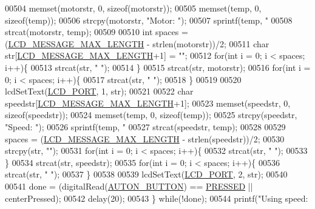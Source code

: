 \begin{DoxyCode}
{{{{{00504         memset(motorstr, 0, \textcolor{keyword}{sizeof}(motorstr));
00505         memset(temp, 0, \textcolor{keyword}{sizeof}(temp));
00506         strcpy(motorstr, \textcolor{stringliteral}{"Motor: "});
00507         sprintf(temp, \textcolor{stringliteral}{"%
00508         strcat(motorstr, temp);
00509 
00510         \textcolor{keywordtype}{int} spaces = (\hyperlink{lcdmsg_8h_abe4c4b70fc6f44ae3680e5b2c68cdd00}{LCD\_MESSAGE\_MAX\_LENGTH} - strlen(motorstr))/2;
00511         \textcolor{keywordtype}{char} str[\hyperlink{lcdmsg_8h_abe4c4b70fc6f44ae3680e5b2c68cdd00}{LCD\_MESSAGE\_MAX\_LENGTH}+1] = \textcolor{stringliteral}{""};
00512         \textcolor{keywordflow}{for}(\textcolor{keywordtype}{int} i = 0; i < spaces; i++)\{
00513             strcat(str, \textcolor{stringliteral}{" "});
00514         \}
00515         strcat(str, motorstr);
00516         \textcolor{keywordflow}{for}(\textcolor{keywordtype}{int} i = 0; i < spaces; i++)\{
00517             strcat(str, \textcolor{stringliteral}{" "});
00518         \}
00519 
00520         lcdSetText(\hyperlink{lcdmsg_8h_abcf42bd88b3c36193f301ca25b033875}{LCD\_PORT}, 1, str);
00521 
00522         \textcolor{keywordtype}{char} speedstr[\hyperlink{lcdmsg_8h_abe4c4b70fc6f44ae3680e5b2c68cdd00}{LCD\_MESSAGE\_MAX\_LENGTH}+1];
00523         memset(speedstr, 0, \textcolor{keyword}{sizeof}(speedstr));
00524         memset(temp, 0, \textcolor{keyword}{sizeof}(temp));
00525         strcpy(speedstr, \textcolor{stringliteral}{"Speed: "});
00526         sprintf(temp, \textcolor{stringliteral}{"%
00527         strcat(speedstr, temp);
00528 
00529         spaces = (\hyperlink{lcdmsg_8h_abe4c4b70fc6f44ae3680e5b2c68cdd00}{LCD\_MESSAGE\_MAX\_LENGTH} - strlen(speedstr))/2;
00530         strcpy(str, \textcolor{stringliteral}{""});
00531         \textcolor{keywordflow}{for}(\textcolor{keywordtype}{int} i = 0; i < spaces; i++)\{
00532             strcat(str, \textcolor{stringliteral}{" "});
00533         \}
00534         strcat(str, speedstr);
00535         \textcolor{keywordflow}{for}(\textcolor{keywordtype}{int} i = 0; i < spaces; i++)\{
00536             strcat(str, \textcolor{stringliteral}{" "});
00537         \}
00538 
00539         lcdSetText(\hyperlink{lcdmsg_8h_abcf42bd88b3c36193f301ca25b033875}{LCD\_PORT}, 2, str);
00540 
00541         done = (digitalRead(\hyperlink{autonrecorder_8h_a5e5e9512ca0c5f741113ae51b24258c1}{AUTON\_BUTTON}) == \hyperlink{friendly_8h_a654adff3c664f27f0b29c24af818dd26}{PRESSED} || centerPressed);
00542         delay(20);
00543     \} \textcolor{keywordflow}{while}(!done);
00544     printf(\textcolor{stringliteral}{"Using speed: %
}}}}}}}}
\end{DoxyCode}
